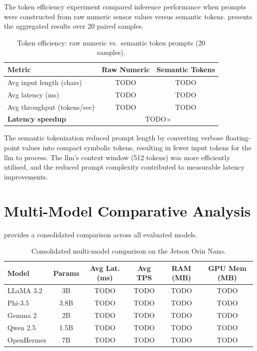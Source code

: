\documentclass[12pt,a4paper,oneside]{report}
\begin{document}
The token efficiency experiment compared inference performance when prompts were constructed from raw numeric sensor values versus semantic tokens.  presents the aggregated results over 20 paired samples.

\begin{table}[htbp]
\caption{Token efficiency: raw numeric vs.\ semantic token prompts (20 samples).}
\label{tab:token-efficiency}
\centering
\begin{tabular}{lcc}
\toprule
\textbf{Metric} & \textbf{Raw Numeric} & \textbf{Semantic Tokens} \\
\midrule
Avg input length (chars)    & TODO & TODO \\
Avg latency (ms)            & TODO & TODO \\
Avg throughput (tokens/sec) & TODO & TODO \\
\midrule
\textbf{Latency speedup}   & \multicolumn{2}{c}{TODO$\times$} \\
\bottomrule
\end{tabular}
\end{table}


The semantic tokenization reduced prompt length by converting verbose floating-point values into compact symbolic tokens, resulting in fewer input tokens for the \gls{llm} to process. The \gls{llm}'s context window (512 tokens) was more efficiently utilised, and the reduced prompt complexity contributed to measurable latency improvements.


\section{Multi-Model Comparative Analysis}
\label{sec:res-comparison}

 provides a consolidated comparison across all evaluated models.

\begin{table}[htbp]
\caption{Consolidated multi-model comparison on the Jetson Orin Nano.}
\label{tab:model-comparison}
\centering
\small
\begin{tabular}{lccccc}
\toprule
\textbf{Model} & \textbf{Params} & \textbf{Avg Lat. (ms)} & \textbf{Avg TPS} & \textbf{RAM (MB)} & \textbf{GPU Mem (MB)} \\
\midrule
LLaMA 3.2      & 3B   & TODO & TODO & TODO & TODO \\
Phi-3.5         & 3.8B & TODO & TODO & TODO & TODO \\
Gemma 2         & 2B   & TODO & TODO & TODO & TODO \\
Qwen 2.5        & 1.5B & TODO & TODO & TODO & TODO \\
OpenHermes      & 7B   & TODO & TODO & TODO & TODO \\
\bottomrule
\end{tabular}
\end{table}
\end{document}

